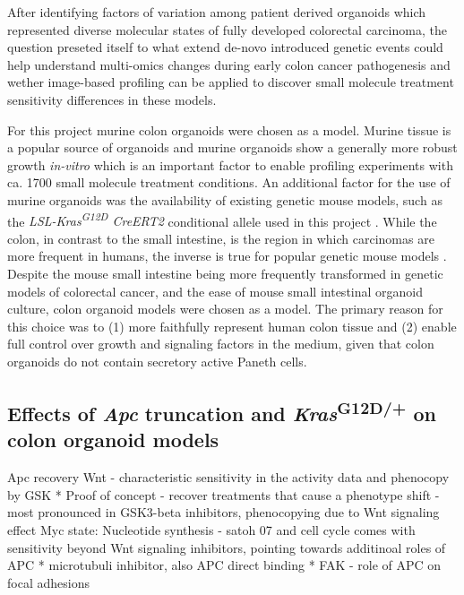\begin{flushleft}
After identifying factors of variation among patient derived organoids which represented diverse molecular states of fully developed colorectal carcinoma, the question preseted itself to what extend de-novo introduced genetic events could help understand multi-omics changes during early colon cancer pathogenesis and wether image-based profiling can be applied to discover small molecule treatment sensitivity differences in these models. 
\par

For this project murine colon organoids were chosen as a model. Murine tissue is a popular source of organoids \citep{satoSingleLgr5Stem2009} and murine organoids show a generally more robust growth \textit{in-vitro} which is an important factor to enable profiling experiments with ca. 1700 small molecule treatment conditions. An additional factor for the use of murine organoids was the availability of existing genetic mouse models, such as the \textit{LSL-Kras\textsuperscript{G12D} CreERT2} conditional allele used in this project \citep{jacksonAnalysisLungTumor2001}. While the colon, in contrast to the small intestine, is the region in which carcinomas are more frequent in humans, the inverse is true for popular genetic mouse models \citep{luoMutatedKrasAsp12Promotes2009}. Despite the mouse small intestine being more frequently transformed in genetic models of colorectal cancer, and the ease of mouse small intestinal organoid culture, colon organoid models were chosen as a model. The primary reason for this choice was to (1) more faithfully represent human colon tissue and (2) enable full control over growth and signaling factors in the medium, given that colon organoids do not contain secretory active Paneth cells. 

\subsection{Effects of \textit{Apc} truncation and \textit{Kras}\textsuperscript{G12D/+} on colon organoid models}

Apc recovery 
Wnt - characteristic sensitivity in the activity data and phenocopy by GSK * Proof of concept - recover treatments that cause a phenotype shift - most pronounced in GSK3-beta inhibitors, phenocopying due to Wnt signaling effect
Myc state:
Nucleotide synthesis - satoh 07 and cell cycle
comes with sensitivity beyond Wnt signaling inhibitors, pointing towards additinoal roles of APC
* microtubuli inhibitor, also APC direct binding
* FAK - role of APC on focal adhesions
\par


\end{flushleft}

